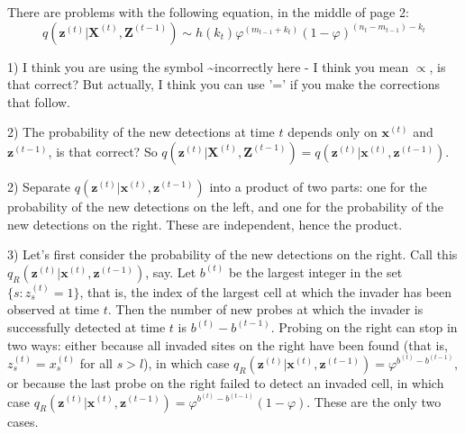 \documentclass[11pt,a4paper]{article}
\renewcommand{\vec}[1]{\mathbf{#1}}
\begin{document}
There are problems with the following equation, in the middle of page 2:
\[
    q(\vec{z}^{(t)} | \vec{X}^{(t)}, \vec{Z}^{(t-1)}) \sim h(k_t) \varphi^{(m_{t-1}+k_t)} (1-\varphi)^{(n_t-m_{t-1})-k_t}
\]

1) I think you are using the symbol \sim incorrectly here - I think you mean $\propto$, is that correct? But actually, I think you can use '=' if you make the corrections that follow.

2) The probability of the new detections at time $t$ depends only on $\vec{x}^{(t)}$ and $\vec{z}^{(t-1)}$, is that correct? So $q(\vec{z}^{(t)} | \vec{X}^{(t)}, \vec{Z}^{(t-1)}) = q(\vec{z}^{(t)} | \vec{x}^{(t)}, \vec{z}^{(t-1)})$.

2) Separate $q(\vec{z}^{(t)} | \vec{x}^{(t)}, \vec{z}^{(t-1)})$ into a product of two parts: one for the probability of the new detections on the left, and one for the probability of the new detections on the right. These are independent, hence the product.

3) Let's first consider the probability of the new detections on the right. Call this $q_R(\vec{z}^{(t)} | \vec{x}^{(t)}, \vec{z}^{(t-1)})$, say. Let $b^{(t)}$ be the largest integer in the set $\{ s : z_s^{(t)} = 1 \}$, that is, the index of the largest cell at which the invader has been observed at time $t$. Then the number of new probes at which the invader is successfully detected at time $t$ is $b^{(t)} - b^{(t-1)}$. Probing on the right can stop in two ways: either because all invaded sites on the right have been found (that is, $z_s^{(t)} = x_s^{(t)}$ for all $s > l$), in which case $q_R(\vec{z}^{(t)} | \vec{x}^{(t)}, \vec{z}^{(t-1)}) = \varphi^{b^{(t)} - b^{(t-1)}}$, or because the last probe on the right failed to detect an invaded cell, in which case $q_R(\vec{z}^{(t)} | \vec{x}^{(t)}, \vec{z}^{(t-1)}) = \varphi^{b^{(t)} - b^{(t-1)}} (1 - \varphi)$. These are the only two cases.
\end{document}
